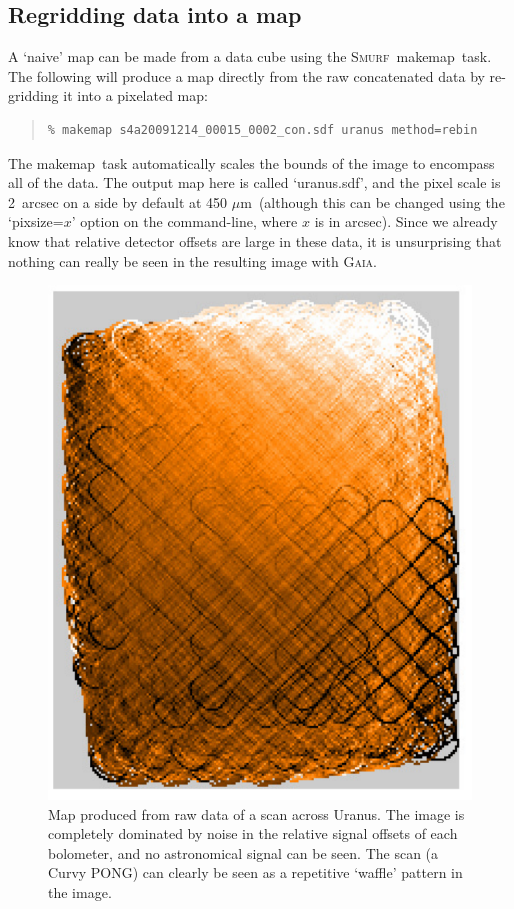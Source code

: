 \documentclass[twoside,11pt]{article}
\newcommand{\micron}{\mbox{\,${\mu}$m}}            %
\newenvironment{myquote}{\begin{quote}\begin{small}}{\end{small}\end{quote}}
\newcommand{\gaia}{\xref{\textsc{Gaia}}{sun214}{}}
\newcommand{\smurf}{\xref{\textsc{Smurf}}{sun258}{}}
\newcommand{\task}[1]{\textsf{#1}}
\newcommand{\makemap}{\xref{\task{makemap}}{sun258}{MAKEMAP}}
\newcommand{\xref}[3]{#1}
\newcommand{\xlabel}[1]{}
\renewcommand{\_}{\texttt{\symbol{95}}}
\begin{document}
\subsection{\xlabel{regrid_map}Regridding data into a map}

A `naive' map can be made from a data cube using the \smurf\ \makemap\
task. The following will produce a map directly from the raw
concatenated data by re-gridding it into a pixelated map:

\begin{myquote}
\begin{verbatim}
% makemap s4a20091214_00015_0002_con.sdf uranus method=rebin
\end{verbatim}
\end{myquote}

The \makemap\ task automatically scales the bounds of the image to
encompass all of the data. The output map here is called `uranus.sdf',
and the pixel scale is 2~arcsec on a side by default at 450\,\micron\
(although this can be changed using the `pixsize=$x$' option on the
command-line, where $x$ is in arcsec). Since we already know that
relative detector offsets are large in these data, it is unsurprising
that nothing can really be seen in the resulting image with \gaia.

\begin{figure}
\begin{center}
\includegraphics[width=0.5\linewidth]{sc19_rawmap}
\caption{Map produced from raw data of a scan across Uranus. The
  image is completely dominated by noise in the relative signal
  offsets of each bolometer, and no astronomical signal can be
  seen. The scan (a Curvy PONG) can clearly be seen as a repetitive
  `waffle' pattern in the image.}
\label{fig:rawmap}
\end{center}
\end{figure}
\end{document}
